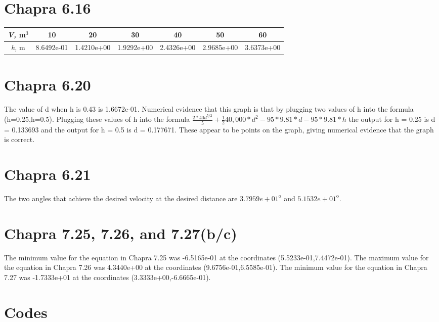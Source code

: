 \documentclass{article}
\begin{document}
\section{Chapra 6.16}
\begin{center}
\renewcommand{\arraystretch}{1.5}
\begin{tabular}{|c||c|c|c|c|c|c|}
\hline \textit{V,} m$^3$ & 10 & 20 & 30 & 40 & 50 & 60\\ \hline
\textit{h,} m & 8.6492e-01 & 1.4210e+00 & 1.9292e+00 & 2.4326e+00 & 2.9685e+00 & 3.6373e+00\\ \hline
\end{tabular}
\end{center}

\section{Chapra 6.20}
The value of d when h is 0.43 is 1.6672e-01. Numerical evidence that this graph is that by plugging two values of h into the formula (h=0.25,h=0.5). Plugging these values of h into the formula $\frac{2*40d^{5/2}}{5}+\frac{1}{2}40,000*d^2-95*9.81*d-95*9.81*h$ the output for h = 0.25 is d = 0.133693 and the output for h = 0.5 is d = 0.177671. These appear to be points on the graph, giving numerical evidence that the graph is correct.
\section{Chapra 6.21}
The two angles that achieve the desired velocity at the desired distance are $3.7959e+01^\mathrm{o}$ and $5.1532e+01^\mathrm{o}$.

\section{Chapra 7.25, 7.26, and 7.27(b/c)}
The minimum value for the equation in Chapra 7.25 was -6.5165e-01 at the coordinates (5.5233e-01,7.4472e-01).\newline
The maximum value for the equation in Chapra 7.26 was 4.3440e+00 at the coordinates (9.6756e-01,6.5585e-01).\newline
The minimum value for the equation in Chapra 7.27 was -1.7333e+01 at the coordinates (3.3333e+00,-6.6665e-01).
\pagebreak

\appendix
\section{Codes}
\end{document}
